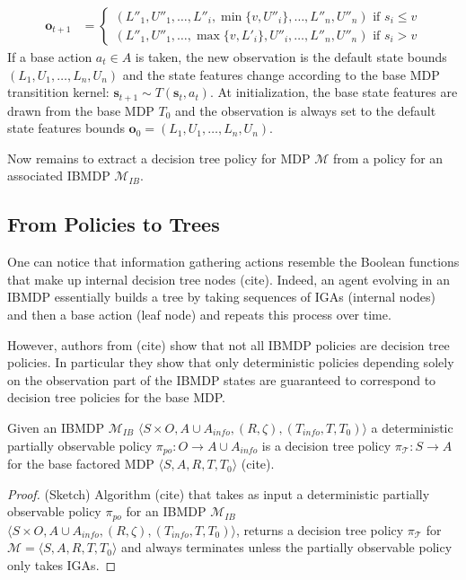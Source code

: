 \begin{definition}
\begin{itemize}
\begin{align*}
    \boldsymbol{o}_{t+1} &= \begin{cases}
        (L''_1, U''_1, \dots , L''_i, \min\{v, U''_i\}, \dots , L''_n, U''_n) \text{ if } s_i \leq v\\
        (L''_1, U''_1, \dots , \max\{v, L'_i\}, U''_i, \dots , L''_n, U''_n) \text{ if } s_i > v
    \end{cases}
\end{align*}
If a base action $a_t\in A$ is taken, the new observation is the default state bounds $(L_1, U_1,\dots, L_n, U_n)$ and the state features change according to the base MDP transitition kernel: $\boldsymbol{s}_{t+1}\sim T(\boldsymbol{s}_t, a_t)$.
At initialization, the base state features are drawn from the base MDP $T_0$ and the observation is always set to the default state features bounds $\boldsymbol{o}_0=(L_1, U_1,\dots, L_n, U_n)$.
\end{itemize}
\end{definition}
Now remains to extract a decision tree policy for MDP $\mathcal{M}$ from a policy for an associated IBMDP $\mathcal{M}_{IB}$. 

\subsection{From Policies to Trees}

One can notice that information gathering actions resemble the Boolean functions that make up internal decision tree nodes (cite). 
Indeed, an agent evolving in an IBMDP essentially builds a tree by taking sequences of IGAs (internal nodes) and then a base action (leaf node) and repeats this process over time.

However, authors from (cite) show that not all IBMDP policies are decision tree policies. In particular they show that only deterministic policies depending solely on the observation part of the IBMDP states are guaranteed to correspond to decision tree policies for the base MDP.

\begin{proposition} 
    Given an IBMDP $\mathcal{M}_{IB} $ $ \langle S \times O,A \cup A_{info}, (R, \zeta), (T_{info}, T, T_0)\rangle$ a deterministic partially observable policy $\pi_{po}: O \rightarrow A\cup A_{info}$ is a decision tree policy $\pi_{\mathcal{T}}: S \rightarrow A$ for the base factored MDP $\langle S, A, R, T, T_0\rangle$ (cite).
\end{proposition}
\begin{proof}(Sketch) Algorithm (cite) that takes as input a deterministic partially observable policy $\pi_{po}$ for an IBMDP $\mathcal{M}_{IB}$ $\langle S \times O,A \cup A_{info}, (R, \zeta), (T_{info}, T, T_0)\rangle$, returns a decision tree policy $\pi_{\mathcal{T}}$ for $\mathcal{M}=\langle S, A, R, T, T_0\rangle$ and always terminates unless the partially observable policy only takes IGAs.
\end{proof}

